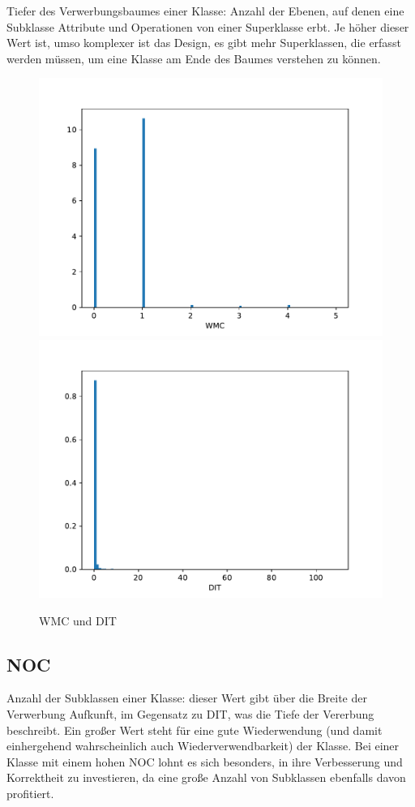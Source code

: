 \documentclass{scrreprt}
\begin{document}
Tiefer des Verwerbungsbaumes einer Klasse: Anzahl der Ebenen, auf denen eine Subklasse Attribute und Operationen von einer Superklasse erbt. Je höher dieser Wert ist, umso komplexer ist das Design, es gibt mehr Superklassen, die erfasst werden müssen, um eine Klasse am Ende des Baumes verstehen zu können.

\begin{figure}
 \includegraphics[width=.45\textwidth]{./WMC.pdf}
  \includegraphics[width=.45\textwidth]{./DIT.pdf}
 \caption{WMC und DIT}
 \label{abb:wmc}
\end{figure}


\subsection{NOC}

Anzahl der Subklassen einer Klasse: dieser Wert gibt über die Breite der Verwerbung Aufkunft, im Gegensatz zu DIT, was die Tiefe der Vererbung beschreibt. Ein großer Wert steht für eine gute Wiederwendung (und damit einhergehend wahrscheinlich auch Wiederverwendbarkeit) der Klasse. Bei einer Klasse mit einem hohen NOC lohnt es sich besonders, in ihre Verbesserung und Korrektheit zu investieren, da eine große Anzahl von Subklassen ebenfalls davon profitiert.
\end{document}
